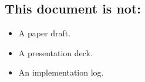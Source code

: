 \subsection*{This document is not:}

\begin{itemize}
  \item A paper draft.
  \item A presentation deck.
  \item An implementation log.
\end{itemize}

\clearpage
